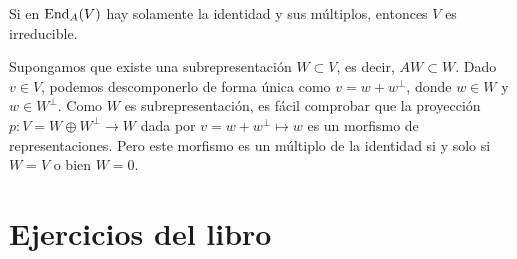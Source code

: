 \documentclass[twoside]{article}
\begin{document}
\newpage

\begin{ejercicio}{3}
Si en $\operatorname{End}_A(V)$ hay solamente la identidad y sus múltiplos, entonces $V$ es irreducible.
\end{ejercicio}
\begin{solucion}
Supongamos que existe una subrepresentación $W\subset V$, es decir, $AW\subset W$. Dado $v\in V$, podemos descomponerlo de forma única como $v=w+w^\perp$, donde $w\in W$ y $w\in W^\perp$. Como $W$ es subrepresentación, es fácil comprobar que la proyección $p:V=W\oplus W^\perp\to W$ dada por $v=w+w^\perp\mapsto w$ es un morfismo de representaciones. Pero este morfismo es un múltiplo de la identidad si y solo si $W=V$ o bien $W=0$. 
\end{solucion}

\newpage

\section{Ejercicios del libro}
\end{document}
